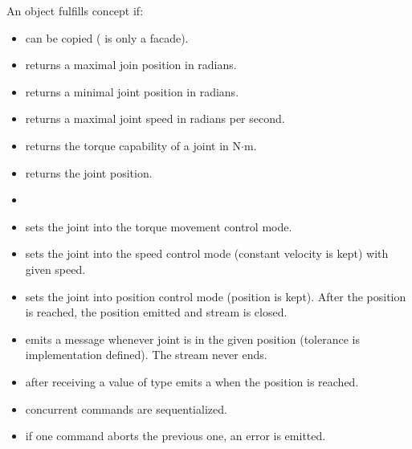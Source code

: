 \noindent An object  fulfills concept  if:
\begin{itemize}
    \item {} can be copied ( is only a facade).
    \item {} returns a maximal join position in
    radians.
    \item {} returns a minimal joint position
    in radians.
    \item {} returns a maximal joint speed
    in radians per second.
    \item {} returns the
    torque capability of a joint in N$\cdot$m.
    \item {} returns the joint position.
    \item {}
    \item {} sets the joint into the
    torque movement control mode.
    \item {} sets the joint into the
    speed control mode (constant velocity is kept) with given speed.
    \item {}
    sets the joint into position control mode (position is kept). After the
    position is reached, the position emitted and stream is closed.
    \item {} emits a
    message whenever joint is in the given position (tolerance is implementation
    defined). The stream never ends.
    \item {}
    after receiving a value of type  emits a  when the
    position is reached.
    \item concurrent commands are sequentialized.
    \item if one command aborts the previous one, an error is emitted.
\end{itemize}

